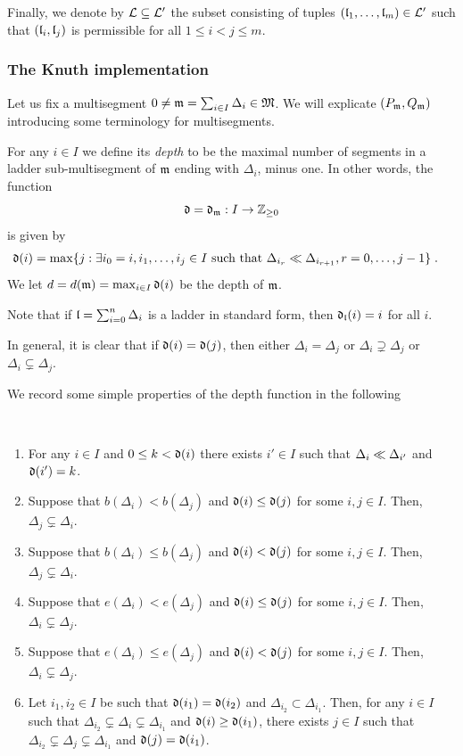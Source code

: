 \documentclass{ert-l} %
\begin{document}
Finally, we denote by $\mathcal{L}\subseteq \mathcal{L}'$ the subset consisting of tuples $(\mathfrak{l}_1,\dots,\mathfrak{l}_m)\in \mathcal{L}'$ such that $(\mathfrak{l}_i,\mathfrak{l}_j)$
is permissible for all $1\le i<j\le m$.

\subsubsection{The Knuth implementation}\label{subsection: implement}
Let us fix a multisegment $0\neq \mathfrak{m}=\sum_{i\in I}\Delta_i\in \mathfrak{M}$.
We will explicate $(P_{\mathfrak{m}},Q_{\mathfrak{m}})$ introducing some terminology for multisegments.

For any $i\in I$ we define its \emph{depth} to be the maximal number of segments in a ladder sub-multisegment
of $\mathfrak{m}$ ending with $\Delta_i$, minus one. In other words, the function
\[
\mathfrak{d}=\mathfrak{d}_{\mathfrak{m}}:I\rightarrow\mathbb{Z}_{\ge0}
\]
is given by
\begin{align*}
\mathfrak{d}(i)=\max\{j:\exists i_0=i,i_1,\dots,i_j\in I\text{ such that }&\Delta_{i_{r}}\ll\Delta_{i_{r+1}}
,r=0,\dots,j-1\}\;.
\end{align*}
We let $d=d(\mathfrak{m})=\max_{i\in I}\mathfrak{d}(i)$ be the depth of $\mathfrak{m}$.

Note that if $\mathfrak{l}=\sum_{i=0}^n\Delta_i$ is a ladder in standard form, then $\mathfrak{d}_{\mathfrak{l}}(i)=i$ for all $i$.

In general, it is clear that if $\mathfrak{d}(i)=\mathfrak{d}(j)$, then
either $\Delta_i=\Delta_j$ or $\Delta_i\supsetneq\Delta_j$ or $\Delta_i\subsetneq\Delta_j$.

We record some simple properties of the depth function in the following

\begin{lemma} \ \label{lem: ib}
\begin{enumerate}
\item \label{itm: ib-first}
For any $i\in I$ and $0\le k<\mathfrak{d}(i)$ there exists $i'\in I$ such that $\Delta_i\ll\Delta_{i'}$ and $\mathfrak{d}(i')=k$.
\item \label{item: elem2}
Suppose that $b(\Delta_i)<b(\Delta_j)$ and $\mathfrak{d}(i)\le\mathfrak{d}(j)$ for some $i,j\in I$. Then, $\Delta_j\subsetneq\Delta_i$.
\item \label{item: elem2a}
Suppose that $b(\Delta_i)\le b(\Delta_j)$ and $\mathfrak{d}(i)<\mathfrak{d}(j)$ for some $i,j\in I$. Then, $\Delta_j\subsetneq\Delta_i$.
\item \label{item: elem3}
Suppose that $e(\Delta_i)<e(\Delta_j)$ and $\mathfrak{d}(i)\le\mathfrak{d}(j)$ for some $i,j\in I$. Then, $\Delta_i\subsetneq\Delta_j$.
\item \label{item: elem4}
Suppose that $e(\Delta_i)\le e(\Delta_j)$ and $\mathfrak{d}(i)<\mathfrak{d}(j)$ for some $i,j\in I$. Then, $\Delta_i\subsetneq\Delta_j$.
\item \label{itm: ib-second}
Let $i_1,i_2\in I$ be such that $\mathfrak{d}(i_1)=\mathfrak{d}(i_2)$ and $\Delta_{i_2}\subset\Delta_{i_1}$.
Then, for any $i\in I$ such that $\Delta_{i_2}\subsetneq\Delta_i\subsetneq\Delta_{i_1}$
and $\mathfrak{d}(i)\ge\mathfrak{d}(i_1)$, there exists $j\in I$ such that $\Delta_{i_2}\subsetneq\Delta_j\subsetneq\Delta_{i_1}$ and
$\mathfrak{d}(j)=\mathfrak{d}(i_1)$.
\end{enumerate}
\end{lemma}
\end{document}
